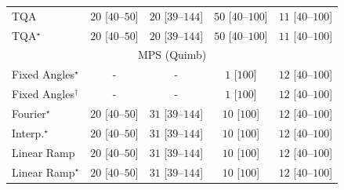 \begin{tabular}{l|cccc|}
TQA & {\cellcolor[HTML]{E8F6E4}} \color[HTML]{000000} $20$ [$40$--$50$] & {\cellcolor[HTML]{E8F6E4}} \color[HTML]{000000} $20$ [$39$--$144$] & {\cellcolor[HTML]{C2E7BB}} \color[HTML]{000000} $50$ [$40$--$100$] & {\cellcolor[HTML]{F0F9EC}} \color[HTML]{000000} $11$ [$40$--$100$] \\
TQA$^\star$ & {\cellcolor[HTML]{E8F6E4}} \color[HTML]{000000} $20$ [$40$--$50$] & {\cellcolor[HTML]{E8F6E4}} \color[HTML]{000000} $20$ [$39$--$144$] & {\cellcolor[HTML]{C2E7BB}} \color[HTML]{000000} $50$ [$40$--$100$] & {\cellcolor[HTML]{F0F9EC}} \color[HTML]{000000} $11$ [$40$--$100$] \\
\cline{1-5}
\multicolumn{5}{c}{\rule{0pt}{8pt}MPS (Quimb)} \\
\midrule
Fixed Angles$^\star$ & {\cellcolor[HTML]{000000}} \color[HTML]{F1F1F1} {\cellcolor{white}} \color{black} - & {\cellcolor[HTML]{000000}} \color[HTML]{F1F1F1} {\cellcolor{white}} \color{black} - & {\cellcolor[HTML]{F7FCF5}} \color[HTML]{000000} $1$ [$100$] & {\cellcolor[HTML]{EFF9EB}} \color[HTML]{000000} $12$ [$40$--$100$] \\
Fixed Angles$^\dagger$ & {\cellcolor[HTML]{000000}} \color[HTML]{F1F1F1} {\cellcolor{white}} \color{black} - & {\cellcolor[HTML]{000000}} \color[HTML]{F1F1F1} {\cellcolor{white}} \color{black} - & {\cellcolor[HTML]{F7FCF5}} \color[HTML]{000000} $1$ [$100$] & {\cellcolor[HTML]{EFF9EB}} \color[HTML]{000000} $12$ [$40$--$100$] \\
Fourier$^\star$ & {\cellcolor[HTML]{E8F6E4}} \color[HTML]{000000} $20$ [$40$--$50$] & {\cellcolor[HTML]{DCF2D7}} \color[HTML]{000000} $31$ [$39$--$144$] & {\cellcolor[HTML]{F0F9ED}} \color[HTML]{000000} $10$ [$100$] & {\cellcolor[HTML]{EFF9EB}} \color[HTML]{000000} $12$ [$40$--$100$] \\
Interp.$^\star$ & {\cellcolor[HTML]{E8F6E4}} \color[HTML]{000000} $20$ [$40$--$50$] & {\cellcolor[HTML]{DCF2D7}} \color[HTML]{000000} $31$ [$39$--$144$] & {\cellcolor[HTML]{F0F9ED}} \color[HTML]{000000} $10$ [$100$] & {\cellcolor[HTML]{EFF9EB}} \color[HTML]{000000} $12$ [$40$--$100$] \\
Linear Ramp & {\cellcolor[HTML]{E8F6E4}} \color[HTML]{000000} $20$ [$40$--$50$] & {\cellcolor[HTML]{DCF2D7}} \color[HTML]{000000} $31$ [$39$--$144$] & {\cellcolor[HTML]{F0F9ED}} \color[HTML]{000000} $10$ [$100$] & {\cellcolor[HTML]{EFF9EB}} \color[HTML]{000000} $12$ [$40$--$100$] \\
Linear Ramp$^\star$ & {\cellcolor[HTML]{E8F6E4}} \color[HTML]{000000} $20$ [$40$--$50$] & {\cellcolor[HTML]{DCF2D7}} \color[HTML]{000000} $31$ [$39$--$144$] & {\cellcolor[HTML]{F0F9ED}} \color[HTML]{000000} $10$ [$100$] & {\cellcolor[HTML]{EFF9EB}} \color[HTML]{000000} $12$ [$40$--$100$] \\

\end{tabular}
